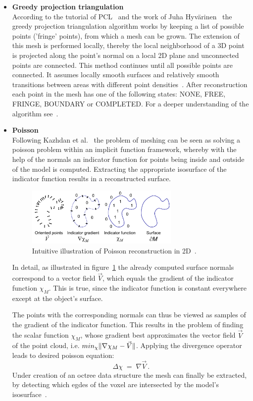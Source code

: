 \documentclass[paper=a4,11pt,bibliography=totoc]{scrartcl}
\begin{document}
\begin{itemize}
\item \textbf{Greedy projection triangulation}\\
According to the tutorial of PCL~\cite{pcldoc} and the work of Juha Hyvärinen~\cite{recon} the greedy projection triangulation algorithm works by keeping a list of possible points ('fringe' points), from which a mesh can be grown. The extension of this mesh is performed locally, thereby the local neighborhood of a 3D point is projected along the point's normal on  a local 2D plane and unconnected points are connected. This method continues until all possible points are connected. It assumes locally smooth surfaces and relatively smooth transitions between areas with different point densities~\cite{pcldoc}. After reconstruction each point in the mesh has one of the following states: \textsf{NONE}, \textsf{FREE}, \textsf{FRINGE}, \textsf{BOUNDARY} or \textsf{COMPLETED}. For a deeper understanding of the algorithm see~\cite{greedy}.
\item \textbf{Poisson}\\
Following Kazhdan et al.~\cite{poisson} the problem of meshing can be seen as solving a poisson problem within an implicit function framework, whereby with the help of the normals an indicator function for points being inside and outside of the model is computed. Extracting the appropriate isosurface of the indicator function results in a reconstructed surface. 
%
\begin{figure}[htbp]
\centering\includegraphics[width=0.7\textwidth]{poisson.png}
\caption{Intuitive illustration of Poisson reconstruction in 2D~\cite{poisson}.}
\label{fig:poisson}
\end{figure}

In detail, as illustrated in figure~\ref{fig:poisson} the already computed surface normals correspond to a vector field $\vec V$, which equals the gradient of the indicator function $\chi_M$. This is true, since the indicator function is constant everywhere except at the object's surface.

The points with the corresponding normals can thus be viewed as samples of the gradient of the indicator function. This results in the problem of finding the scalar function $\chi_M$, whose gradient best approximates the vector field $\vec V$ of the point cloud, i.e. $min_\chi \Arrowvert \nabla \chi_M-\vec V\Arrowvert$. Applying the divergence operator leads to desired poisson equation:
%
\begin{equation}
\Delta\chi\;=\;\nabla\vec V\,.
\end{equation}
%
Under creation of an octree data structure the mesh can finally be extracted, by detecting which egdes of the voxel are intersected by the model’s isosurface~\cite{possion2}.


\end{itemize}
\end{document}
